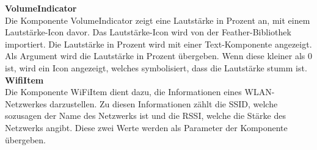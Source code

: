 \documentclass[]{article}
\begin{document}
\textbf{VolumeIndicator} \\
Die Komponente VolumeIndicator zeigt eine Lautstärke in Prozent an, mit einem Lautstärke-Icon davor. Das Lautstärke-Icon wird von der Feather-Bibliothek importiert. Die Lautstärke in Prozent wird mit einer Text-Komponente angezeigt. Als Argument wird die Lautstärke in Prozent übergeben. Wenn diese kleiner als 0 ist, wird ein Icon angezeigt, welches symbolisiert, dass die Lautstärke stumm ist. \newline \\
\textbf{WifiItem} \\
Die Komponente WiFiItem dient dazu, die Informationen eines WLAN-Netzwerkes darzustellen. Zu diesen Informationen zählt die SSID, welche sozusagen der Name des Netzwerks ist und die RSSI, welche die Stärke des Netzwerks angibt. Diese zwei Werte werden als Parameter der Komponente übergeben.
\end{document}
